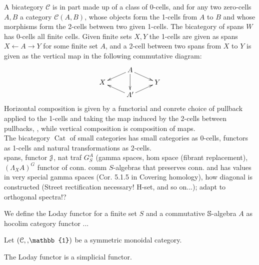     A bicategory $\mathcal{C}$ is in part made up of a class of 0-cells, and for any two zero-cells $A,B$ a category $\mathcal{C}(A,B)$, whose objects form the 1-cells from $A$ to $B$ and whose morphisms form the 2-cells between two given 1-cells. The bicategory of spans $W$ has 0-cells all finite cells. Given finite sets $X,Y$ the 1-cells are given as spans $ X \leftarrow A \rightarrow Y$ for some finite set $A$, and a 2-cell between two spans from $X$ to $Y$  is given as the vertical map in the following commutative diagram:
    \[
    \xymatrix@R-=.5em{
      &
      A \ar[dl] \ar[dd] \ar[dr]
      \\
      X
      &
      &
      Y
      \\
      &
      A^\prime \ar[ul] \ar[ur]
      &
    }
    \]
    Horizontal composition is given by a functorial and conrete choice of pullback applied to the 1-cells and taking the map induced by the 2-cells between pullbacks, , while vertical composition is composition of maps.\\
    The bicategory $\operatorname{Cat}$ of small categories has small categories as 0-cells, functors as 1-cells and natural transformations as 2-cells.
    \\
    spans, functor $\mathcal{J}$, nat traf $G^A_S$ (gamma spaces, hom space (fibrant replacement), $(\Lambda_X A)^G$ functor of conn. comm $S$-algebras that preserves conn. and has values in very special gamma spaces (Cor. 5.1.5 in Covering homology), how diagonal is constructed (Street rectification necessary! H-set, and so on...); adapt to orthogonal spectra!?
    \begin{defn}\label{def_loday_functor}
      We define the Loday functor for a finite set $S$ and a commutative $\mathbb{S}$-algebra $A$ as hocolim category functor ...

    \end{defn}

    \begin{defn}\label{def_loday_functor_in_symmetric_monoidal_category}
      Let $(\mathcal{C},\smash, \mathbb{1})$ be a symmetric monoidal category.\\
    \end{defn}

    \begin{lem}\label{lem_loday_functor_is_simplicial}
      The Loday functor is a simplicial functor.\\

    \end{lem}
